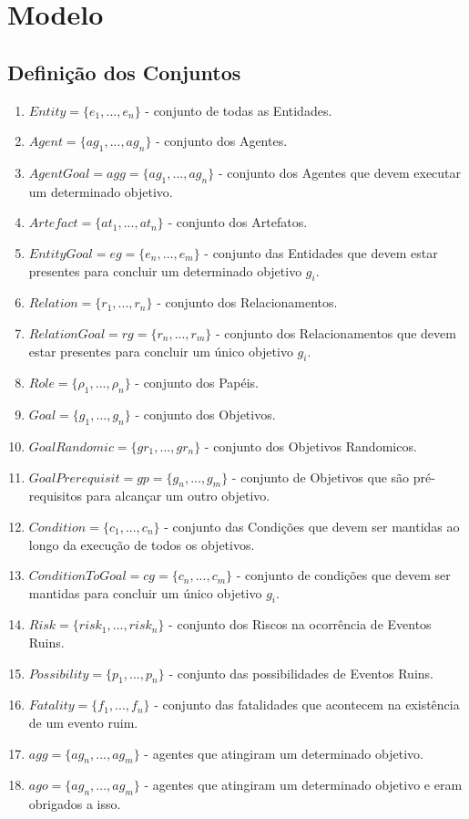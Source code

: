 \documentclass[12pt]{article}
\begin{document}
\section{Modelo}

\subsection{Definição dos Conjuntos}

\begin{enumerate}
	\item $Entity = \{e_1, ..., e_n\}$ - conjunto de todas as Entidades.  
	\item $Agent = \{ag_1, ..., ag_n\}$ - conjunto dos Agentes.
	\item $AgentGoal = agg = \{ag_1, ..., ag_n\}$ - conjunto dos Agentes que devem executar um determinado objetivo. 
	\item $Artefact = \{at_1, ..., at_n\}$ - conjunto dos Artefatos.
	\item $EntityGoal = eg = \{e_n,...,e_m\}$ - conjunto das Entidades que devem estar presentes para concluir um determinado objetivo $g_i$.
	\item $Relation = \{r_1, ..., r_n\}$ - conjunto dos Relacionamentos.	
	\item $RelationGoal = rg =\{r_n, ..., r_m\}$ - conjunto dos Relacionamentos que devem estar presentes para concluir um único objetivo $g_i$.		
	\item $Role = \{\rho_1, ..., \rho_n\}$ - conjunto dos Papéis.	
	\item $Goal = \{g_1, ..., g_n\}$ - conjunto dos Objetivos.
	\item $GoalRandomic = \{gr_1,..., gr_n\}$ - conjunto dos Objetivos	Randomicos.
	\item $GoalPrerequisit = gp = \{g_n,...,g_m\}$ - conjunto de Objetivos que são pré-requisitos para alcançar um outro objetivo.
	\item $Condition = \{c_1, ..., c_n\}$ - conjunto das Condições que devem ser mantidas ao longo da execução de todos os objetivos.
	\item $ConditionToGoal = cg = \{c_n, ..., c_m\}$ - conjunto de condições que devem ser mantidas para concluir um único objetivo $g_i$.
	\item $Risk = \{risk_1, ..., risk_n\}$ - conjunto dos Riscos na ocorrência de Eventos Ruins.
	\item $Possibility = \{p_1, ..., p_n\}$ - conjunto das possibilidades de Eventos Ruins. 
	\item $Fatality = \{f_1, ..., f_n\}$ - conjunto das fatalidades que acontecem na existência de um evento ruim. 	
	\item $agg = \{ag_n,...,ag_m\}$ - agentes que atingiram um determinado objetivo. 
	\item $ago = \{ag_n,...,ag_m\}$ - agentes que atingiram um determinado objetivo e eram obrigados a isso. 
\end{enumerate}
\end{document}
